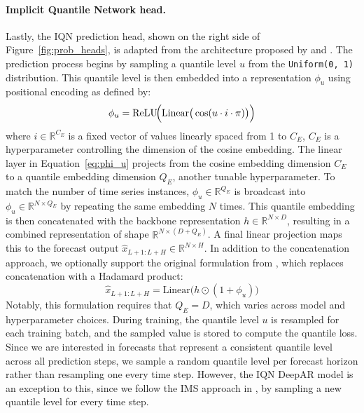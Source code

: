 \documentclass[a4paper,oneside,bibliography=totoc]{scrbook}
\begin{document}
\paragraph{Implicit Quantile Network head.}
Lastly, the IQN prediction head, shown on the right side of Figure~\ref{fig:prob_heads}, is adapted from the architecture proposed by \citet{gouttes_probabilistic_2021} and \citet{dabney_implicit_2018}. The prediction process begins by sampling a quantile level \( u \) from the \texttt{Uniform(0, 1)} distribution. This quantile level is then embedded into a representation \( \phi_u \) using positional encoding as defined by:
\begin{equation}
    \phi_u = \mathrm{ReLU}\!\Bigl(\mathrm{Linear}\big(\cos(u \cdot i \cdot \pi)\big)\Bigr)
    \label{eq:phi_u}
\end{equation}
where \( i \in \mathbb{R}^{C_E} \) is a fixed vector of values linearly spaced from 1 to \( C_E \),  \( C_E \) is a hyperparameter controlling the dimension of the cosine embedding. The linear layer in Equation~\ref{eq:phi_u} projects from the cosine embedding dimension \( C_E \) to a quantile embedding dimension \( Q_E \), another tunable hyperparameter. 
To match the number of time series instances, \( \phi_u \in \mathbb{R}^{
Q_E} \) is broadcast into  \( \phi_u \in \mathbb{R}^{N \times Q_E} \) by repeating the same embedding \( N \) times. This quantile embedding is then concatenated with the backbone representation \( h \in \mathbb{R}^{N \times D} \), resulting in a combined representation of shape \( \mathbb{R}^{N \times (D + Q_E)} \). A final linear projection maps this to the forecast output \( \hat{x}_{L+1:L+H} \in \mathbb{R}^{N \times H} \).
In addition to the concatenation approach, we optionally support the original formulation from \citet{gouttes_probabilistic_2021}, which replaces concatenation with a Hadamard product:
\begin{equation}
    \hat{x}_{L+1:L+H} = \mathrm{Linear}\big( h \odot (1+\phi_u)\big)
\end{equation}
Notably, this formulation requires that \( Q_E = D \), which varies across model and hyperparameter choices. 
During training, the quantile level \( u \) is resampled for each training batch, and the sampled value is stored to compute the quantile loss. 
Since we are interested in forecasts that represent a consistent quantile level across all prediction steps, we sample a random quantile level per forecast horizon rather than resampling one every time step.
However, the IQN DeepAR model is an exception to this, since we follow the IMS approach in \citet{gouttes_probabilistic_2021}, by sampling a new quantile level for every time step.
\end{document}
